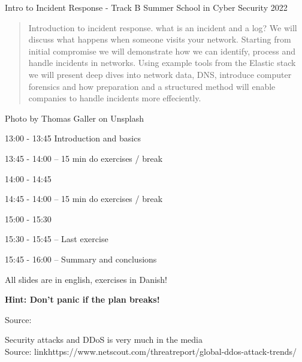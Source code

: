 \documentclass[Screen16to9,17pt]{foils}
\begin{document}
\mytitlepage
{Intro to Incident Response - Track B}
{Summer School in Cyber Security 2022}

\hlkprofiluk



\begin{quote}
Introduction to incident response. what is an incident and a log? We will discuss what happens when someone visits your network. Starting from initial compromise we will demonstrate how we can identify, process and handle incidents in networks. Using example tools from the Elastic stack we will present deep dives into network data, DNS, introduce computer forensics and how preparation and a structured method will enable companies to handle incidents more effeciently.
\end{quote}

Photo by Thomas Galler on Unsplash


\begin{list1}
\item 13:00 - 13:45 Introduction and basics
\item 13:45 - 14:00 -- 15 min do exercises / break
\item 14:00 - 14:45
\item 14:45 - 14:00 -- 15 min do exercises / break
\item 15:00 - 15:30
\item 15:30 - 15:45 -- Last exercise
\item 15:45 - 16:00 -- Summary and conclusions
\end{list1}

All slides are in english, exercises in Danish!

{\bf Hint: Don't panic if the plan breaks!}


Source: 




Security attacks and DDoS is very much in the media\\
Source: link{https://www.netscout.com/threatreport/global-ddos-attack-trends/}

\end{document}
